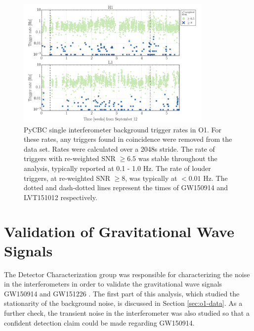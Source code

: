 \begin{figure}[ht!]%
\includegraphics[width=0.85\textwidth]{figures/O1/pycbc-rate-versus-time}
\caption[PyCBC trigger rates in O1]{PyCBC single interferometer background trigger %
         rates in O1. For these rates, any triggers found in coincidence %
         were removed from the data set. Rates were calculated over a 2048s stride. %
         The rate of triggers with %
         re-weighted SNR $\geq 6.5$ was stable throughout the analysis, typically %
         reported at 0.1 - 1.0 Hz. The rate of louder triggers, at re-weighted SNR %
         $\geq 8$, was typically at $< 0.01$ Hz. The dotted and dash-dotted lines %
         represent the times of GW150914 and LVT151012 respectively.
         }
\label{fig:pycbc-rate}
\end{figure}

\section{Validation of Gravitational Wave Signals}\label{sec:GW150914-validation}

The Detector Characterization group was responsible for characterizing the 
noise in the interferometers in order to validate the gravitational 
wave signals GW150914 and GW151226 \cite{GW150914-DETCHAR}. 
The first part of this analysis, which studied the 
stationarity of the background noise, is discussed in Section \ref{sec:o1-data}. 
As a further 
check, the transient noise in the interferometer was also studied so that a 
confident detection claim could be made regarding GW150914. 


